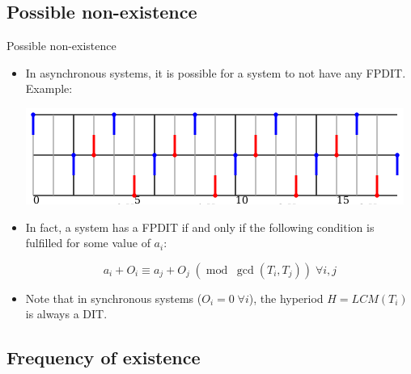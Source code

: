 \documentclass{beamer}
\begin{document}
    \subsection{Possible non-existence}

    \begin{frame}{Possible non-existence}

    \begin{itemize}
        \item In asynchronous systems, it is possible for a system to not have any FPDIT. Example:
        \begin{center}
            \includegraphics[width=.6\textwidth]{figs/nofpdit_example.png}
        \end{center}
        \item In fact, a system has a FPDIT if and only if the following condition is fulfilled for some value of $a_i$:

            \[
                a_i + O_i \equiv a_j + O_j \; (\operatorname{mod} \; \operatorname{gcd}(T_i,
                T_j)) \; \forall i,j
            \]

        \item Note that in synchronous systems ($O_i = 0 \; \forall i$), the hyperiod $H = LCM(T_i)$ is always a DIT.
    \end{itemize}

    \end{frame}

    \subsection{Frequency of existence}
\end{document}

